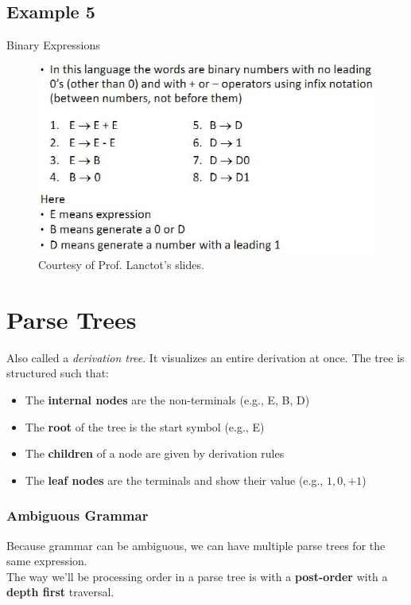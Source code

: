 \documentclass{report}
\begin{document}
\subsection{Example 5}
Binary Expressions
\begin{figure}[ht]
\begin{center}
\includegraphics[scale=0.5]{cfg2.jpg}
\end{center}
\caption{Courtesy of Prof. Lanctot's slides.}
\end{figure}
\section{Parse Trees}
Also called a \textit{derivation tree}. It visualizes an entire derivation at once. The tree is structured such that:
\begin{itemize}
\item The \textbf{internal nodes} are the non-terminals (e.g., E, B, D)
\item The \textbf{root} of the tree is the start symbol (e.g., E)
\item The \textbf{children} of a node are given by derivation rules
\item The \textbf{leaf nodes} are the terminals and show their value (e.g., $1, 0, + 1$)
\end{itemize}
\subsubsection{Ambiguous Grammar}
Because grammar can be ambiguous, we can have multiple parse trees for the same expression.\\
The way we'll be processing order in a parse tree is with a \textbf{post-order} with a \textbf{depth first} traversal.
\end{document}
